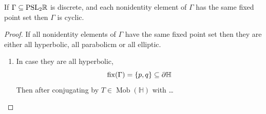 \documentclass[11pt,a4paper]{article}
\renewcommand{\H}{\mathbb H}
\DeclareMathOperator{\Mob}{Mob}
\begin{document}
\begin{theorem}
  If $\Gamma \subseteq \mathrm{PSL}_2\mathbb{R}$ is discrete, and each nonidentity
  element of $\Gamma$ has the same fixed point set then
  $\Gamma$ is cyclic.
\end{theorem}
\begin{proof}
  If all nonidentity elements of $\Gamma$ have the same fixed
  point set then they are either all hyperbolic, all parabolicm
  or all elliptic.
  \begin{enumerate}
    \item[(1)] In case they are all hyperbolic,
      \[
        \mathrm{fix}(\Gamma) = \set{p,q} \subseteq \partial \H
      \]
      Then after conjugating by $T \in \Mob(\H)$ with \dots
  \end{enumerate}
\end{proof}
\end{document}
